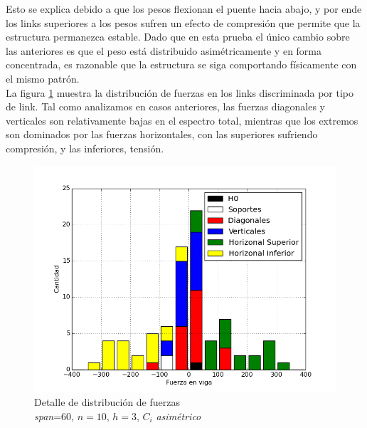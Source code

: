 Esto se explica debido a que los pesos flexionan el puente hacia abajo, y por ende los links superiores a los pesos sufren un efecto de compresión que permite que la estructura permanezca estable. Dado que en esta prueba el único cambio sobre las anteriores es que el peso está distribuido asimétricamente y en forma concentrada, es razonable que la estructura se siga comportando físicamente con el mismo patrón.\\

La figura \ref{fig:hist_asim} muestra la distribución de fuerzas en los links discriminada por tipo de link. Tal como analizamos en casos anteriores, las fuerzas diagonales y verticales son relativamente bajas en el espectro total, mientras que los extremos son dominados por las fuerzas horizontales, con las superiores sufriendo compresión, y las inferiores, tensión.

\begin{figure}[h!]
\begin{center}
\includegraphics[scale=0.5]{archivos/graficos/hist_asim.png}
\caption{\label{fig:hist_asim}Detalle de distribución de fuerzas\\
\textit{span}=$60$, $n=10$, $h=3$, $C_i$ \textit{asimétrico}}
\end{center}
\end{figure}


